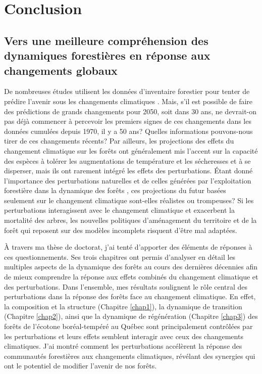 \francais

\chapter*{Conclusion}

\setcounter{chapter}{4}

\hypertarget{vers-une-meilleure-compruxe9hension-des-dynamiques-forestiuxe8res-en-ruxe9ponse-aux-changements-globaux}{%
\section{Vers une meilleure compréhension des dynamiques forestières en
réponse aux changements
globaux}\label{vers-une-meilleure-compruxe9hension-des-dynamiques-forestiuxe8res-en-ruxe9ponse-aux-changements-globaux}}

De nombreuses études utilisent les données d'inventaire forestier pour
tenter de prédire l'avenir sous les changements climatiques
\citep{boulanger_climate_2017, chen_modeling_2002, iverson_estimating_2008, meier_climate_2012, perie_dominant_2016, vissault_biogeographie_2016}.
Mais, s'il est possible de faire des prédictions de grands changements
pour 2050, soit dans 30 ans, ne devrait-on pas déjà commencer à
percevoir les premiers signes de ces changements dans les données
cumulées depuis 1970, il y a 50 ans? Quelles informations pouvons-nous
tirer de ces changements récents? Par ailleurs, les projections des
effets du changement climatique sur les forêts ont généralement mis
l'accent sur la capacité des espèces à tolérer les augmentations de
température et les sécheresses et à se disperser, mais ils ont rarement
intégré les effets des perturbations. Étant donné l'importance des
perturbations naturelles et de celles générées par l'exploitation
forestière dans la dynamique des forêts \citep{turner_disturbance_2010},
ces projections du futur basées seulement sur le changement climatique
sont-elles réalistes ou trompeuses? Si les perturbations interagissent
avec le changement climatique et exacerbent la mortalité des arbres, les
nouvelles politiques d'aménagement du territoire et de la forêt qui
reposent sur des modèles incomplets risquent d'être mal adaptées.

À travers ma thèse de doctorat, j'ai tenté d'apporter des éléments de
réponses à ces questionnements. Ses trois chapitres ont permis
d'analyser en détail les multiples aspects de la dynamique des forêts au
cours des dernières décennies afin de mieux comprendre la réponse aux
effets combinés du changement climatique et des perturbations. Dans
l'ensemble, mes résultats soulignent le rôle central des perturbations
dans la réponse des forêts face au changement climatique. En effet, la
composition et la structure (Chapitre \ref{chap1}), la dynamique de
transition (Chapitre \ref{chap2}), ainsi que la dynamique de
régénération (Chapitre \ref{chap3}) des forêts de l'écotone
boréal-tempéré au Québec sont principalement contrôlées par les
perturbations et leurs effets semblent interagir avec ceux des
changements climatiques. J'ai montré comment les perturbations
accélèrent la réponse des communautés forestières aux changements
climatiques, révélant des synergies qui ont le potentiel de modifier
l'avenir de nos forêts.

